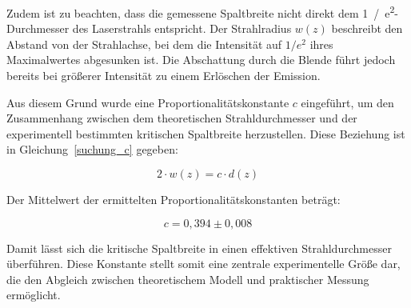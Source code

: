 Zudem ist zu beachten, dass die gemessene Spaltbreite nicht direkt dem \SI{1}{/e^2}-Durchmesser des Laserstrahls entspricht. 
Der Strahlradius \( w(z) \) beschreibt den Abstand von der Strahlachse, bei dem die Intensität auf \( 1/e^2 \) ihres Maximalwertes abgesunken ist. 
Die Abschattung durch die Blende führt jedoch bereits bei größerer Intensität zu einem Erlöschen der Emission.

Aus diesem Grund wurde eine Proportionalitätskonstante \( c \) eingeführt, um den Zusammenhang zwischen dem theoretischen Strahldurchmesser und der experimentell bestimmten kritischen Spaltbreite herzustellen. 
Diese Beziehung ist in Gleichung~\eqref{suchung_c} gegeben:

\begin{equation}
    2 \cdot w(z) = c \cdot d(z)
    \label{suchung_c}
\end{equation}

Der Mittelwert der ermittelten Proportionalitätskonstanten beträgt:

\begin{equation*}
    c = 0{,}394 \pm 0{,}008
\end{equation*}

Damit lässt sich die kritische Spaltbreite in einen effektiven Strahldurchmesser überführen. 
Diese Konstante stellt somit eine zentrale experimentelle Größe dar, die den Abgleich zwischen theoretischem Modell und praktischer Messung ermöglicht.